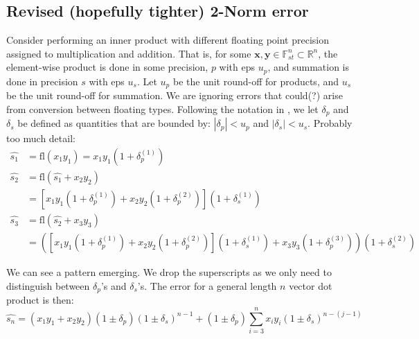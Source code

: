\documentclass{article}
\newcommand{\R}{\mathbb{R}}
\newcommand{\dd}{\delta}
\newcommand{\bb}[1]{\mathbf{#1}}
\newcommand{\fl}{\mathrm{fl}}
\theoremstyle{definition}
\begin{document}
\subsection{Revised (hopefully tighter) 2-Norm error}
Consider performing an inner product with different floating point precision assigned to multiplication and addition. 
That is, for some $\bb{x},\bb{y}\in \mathbb{F}_{st}^{n}\subset\R^n$, the element-wise product is done in some precision, $p$ with eps $u_p$, and summation is done in precision $s$ with eps $u_s$.
Let $u_p$ be the unit round-off for products, and $u_s$ be the unit round-off for summation. 
We are ignoring errors that could(?) arise from conversion between floating types. 
Following the notation in \cite{Higham2002}, we let $\dd_p$ and $\dd_s$ be defined as quantities that are bounded by: $|\dd_p| < u_p$ and $|\dd_s| < u_s$.
{\color{blue} 
Probably too much detail:
\begin{align*}
    \hat{s_1} &= \fl (x_1y_1) = x_1y_1(1 + \dd_p^{(1)})\\
    \hat{s_2} &= \fl(\hat{s_1} + x_2y_2) \\
    &= \left[x_1y_1(1 + \dd_p^{(1)}) + x_2y_2(1 + \dd_p^{(2)})\right](1+\dd_s^{(1)})\\
    \hat{s_3} &= \fl(\hat{s_2}+x_3y_3) \\
    &= \left(\left[x_1y_1(1 + \dd_p^{(1)}) + x_2y_2(1 + \dd_p^{(2)})\right](1+\dd_s^{(1)})  + x_3y_3(1+\dd_p^{(3)})\right)(1+\dd_s^{(2)})
\end{align*}
}

We can see a pattern emerging. We drop the superscripts as we only need to distinguish between $\dd_p$'s and $\dd_s$'s.
The error for a general length $n$ vector dot product is then:
 \begin{equation}
 \label{eqn:dperr_1}
    \hat{s_n} = (x_1y_1+x_2y_2)(1\pm \dd_p)(1\pm\dd_s)^{n-1} + (1\pm\dd_p)\sum_{i=3}^n x_iy_i(1\pm\dd_s)^{n-(j-1)} 
\end{equation}
\end{document}
